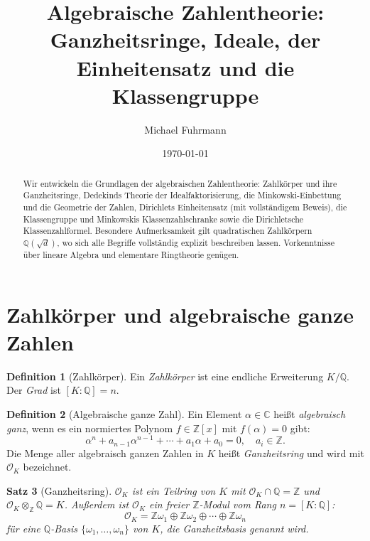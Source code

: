 \documentclass[12pt,a4paper]{amsart}
\newtheorem{theorem}{Satz}[section]
\theoremstyle{definition}
\newtheorem{definition}[theorem]{Definition}
\newcommand{\Z}{\mathbb{Z}}
\newcommand{\Q}{\mathbb{Q}}
\newcommand{\C}{\mathbb{C}}
\newcommand{\OK}{\mathcal{O}_K}
\begin{document}

\title{Algebraische Zahlentheorie:\\
       Ganzheitsringe, Ideale, der Einheitensatz und die Klassengruppe}

\author{Michael Fuhrmann}
\address{Specialist Mathematics Project, Build 119}
\date{\today}

\begin{abstract}
Wir entwickeln die Grundlagen der algebraischen Zahlentheorie: Zahlkörper
und ihre Ganzheitsringe, Dedekinds Theorie der Idealfaktorisierung, die
Minkowski-Einbettung und die Geometrie der Zahlen, Dirichlets Einheitensatz
(mit vollständigem Beweis), die Klassengruppe und Minkowskis Klassenzahlschranke
sowie die Dirichletsche Klassenzahlformel.  Besondere Aufmerksamkeit gilt
quadratischen Zahlkörpern $\Q(\sqrt{d})$, wo sich alle Begriffe vollständig
explizit beschreiben lassen.  Vorkenntnisse über lineare Algebra und elementare
Ringtheorie genügen.
\end{abstract}

\maketitle
\tableofcontents

\section{Zahlkörper und algebraische ganze Zahlen}

\begin{definition}[Zahlkörper]
\label{def:zahlkoerper}
Ein \emph{Zahlkörper} ist eine endliche Erweiterung $K/\Q$.  Der
\emph{Grad} ist $[K:\Q] = n$.
\end{definition}

\begin{definition}[Algebraische ganze Zahl]
\label{def:alg_ganz}
Ein Element $\alpha \in \C$ heißt \emph{algebraisch ganz}, wenn es ein
normiertes Polynom $f \in \Z[x]$ mit $f(\alpha) = 0$ gibt:
\[
  \alpha^n + a_{n-1}\alpha^{n-1} + \cdots + a_1\alpha + a_0 = 0,
  \quad a_i \in \Z.
\]
Die Menge aller algebraisch ganzen Zahlen in $K$ heißt \emph{Ganzheitsring}
und wird mit $\OK$ bezeichnet.
\end{definition}

\begin{theorem}[Ganzheitsring]
\label{thm:OK_ring}
$\OK$ ist ein Teilring von $K$ mit $\OK \cap \Q = \Z$ und
$\OK \otimes_\Z \Q = K$.  Außerdem ist $\OK$ ein freier $\Z$-Modul
vom Rang $n = [K:\Q]$:
\[
  \OK = \Z\omega_1 \oplus \Z\omega_2 \oplus \cdots \oplus \Z\omega_n
\]
für eine $\Q$-Basis $\{\omega_1, \ldots, \omega_n\}$ von $K$, die
\emph{Ganzheitsbasis} genannt wird.
\end{theorem}
\end{document}

